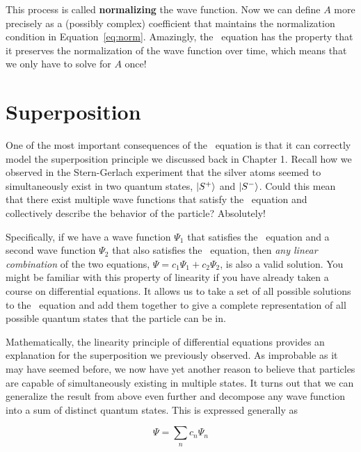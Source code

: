 This process is called \textbf{normalizing} the wave function. Now we can define $A$ more precisely as a (possibly complex) coefficient that maintains the normalization condition in Equation~\ref{eq:norm}. Amazingly, the \Sch\ equation has the property that it preserves the normalization of the wave function over time, which means that we only have to solve for $A$ once!


\section{Superposition} \label{sec:super}
One of the most important consequences of the \Sch\ equation is that it can correctly model the superposition principle we discussed back in Chapter 1. Recall how we observed in the Stern-Gerlach experiment that the silver atoms seemed to simultaneously exist in two quantum states, $\ket{S^+}$ and $\ket{S^-}$. Could this mean that there exist multiple wave functions that satisfy the \Sch\ equation and collectively describe the behavior of the particle? Absolutely! \par 

Specifically, if we have a wave function $\Psi_1$ that satisfies the \Sch\ equation and a second wave function $\Psi_2$ that also satisfies the \Sch\ equation, then \emph{any linear combination} of the two equations, $\Psi = c_1\Psi_1 + c_2\Psi_2$, is also a valid solution. You might be familiar with this property of linearity if you have already taken a course on differential equations. It allows us to take a set of all possible solutions to the \Sch\ equation and add them together to give a complete representation of all possible quantum states that the particle can be in. \par 

Mathematically, the linearity principle of differential equations provides an explanation for the superposition we previously observed. As improbable as it may have seemed before, we now have yet another reason to believe that particles are capable of simultaneously existing in multiple states. It turns out that we can generalize the result from above even further and decompose any wave function into a sum of distinct quantum states. This is expressed generally as
\begin{tcolorbox}[title=Superposition of wave functions] \vspace{-2ex}
	\begin{equation}
		\Psi = \sum_n c_n\Psi_n  \label{eq:super}
	\end{equation}
\end{tcolorbox}

